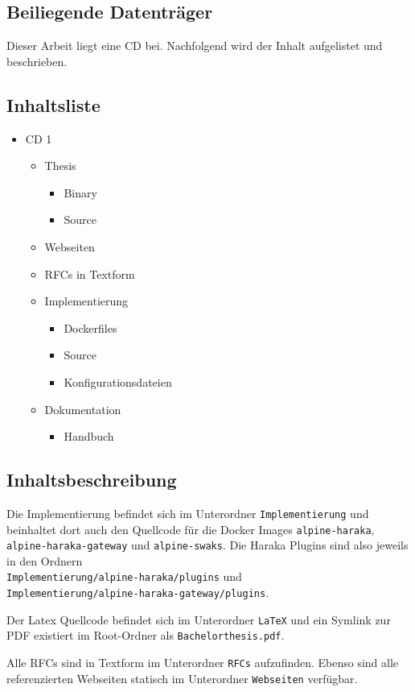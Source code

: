 \begin{appendix}

\chapter{Beiliegende Datenträger}
Dieser Arbeit liegt eine CD bei. Nachfolgend wird der Inhalt aufgelistet und beschrieben.

\section{Inhaltsliste}

\begin{itemize}
	\setlength\itemsep{\Itemizespace}
	\item CD 1
	\begin{itemize}
		\setlength\itemsep{\Itemizespace}
		\item Thesis
			\begin{itemize}
				\setlength\itemsep{\Itemizespace}
				\item Binary
				\item Source
			\end{itemize}
		\item Webseiten
		\item RFCs in Textform
		\item Implementierung
			\begin{itemize}
				\setlength\itemsep{\Itemizespace}
				\item Dockerfiles
				\item Source
				\item Konfigurationsdateien
			\end{itemize}
		\item Dokumentation
			\begin{itemize}
				\item Handbuch
			\end{itemize}
	\end{itemize}
\end{itemize}

\clearpage
\section{Inhaltsbeschreibung}
Die Implementierung befindet sich im Unterordner \verb#Implementierung# und beinhaltet dort auch den Quellcode für die Docker Images \verb#alpine-haraka#, \verb#alpine-haraka-gateway# und \verb#alpine-swaks#. Die Haraka Plugins sind also jeweils in den Ordnern \\ \verb#Implementierung/alpine-haraka/plugins# und \\ \verb#Implementierung/alpine-haraka-gateway/plugins#.

Der Latex Quellcode befindet sich im Unterordner \verb#LaTeX# und ein Symlink zur PDF existiert im Root-Ordner als \verb#Bachelorthesis.pdf#.

Alle RFCs sind in Textform im Unterordner \verb#RFCs# aufzufinden. Ebenso sind alle referenzierten Webseiten statisch im Unterordner \verb#Webseiten# verfügbar.

\end{appendix}


